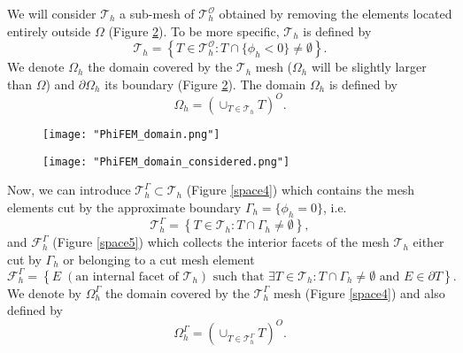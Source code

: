 We will consider $\mathcal{T}_h$ a sub-mesh of $\mathcal{T}_h^\mathcal{O}$ obtained by removing the elements located entirely outside $\Omega$ (Figure \ref{space3}). To be more specific, $\mathcal{T}_h$ is defined by
\begin{equation*}
	\mathcal{T}_h=\left\{T\in \mathcal{T}_h^\mathcal{O}:T\cap\{\phi_h<0\}\ne\emptyset\right\}.
\end{equation*}
We denote $\Omega_h$ the domain covered by the $\mathcal{T}_h$ mesh ($\Omega_h$ will be slightly larger than $\Omega$) and $\partial\Omega_h$ its boundary (Figure \ref{space3}). The domain $\Omega_h$ is defined by
\begin{equation*}
	\Omega_h=\left(\cup_{T\in\mathcal{T}_h}T\right)^O.
\end{equation*}

\begin{minipage}{0.52\linewidth}
	\begin{figure}[H]
		\centering
		\texttt{[image: "PhiFEM\_domain.png"]}
		\label{space2}
	\end{figure}
\end{minipage} \;
\begin{minipage}{0.44\linewidth}
	\begin{figure}[H]
		\centering
		\texttt{[image: "PhiFEM\_domain\_considered.png"]}
		\label{space3}
	\end{figure}
\end{minipage}

Now, we can introduce $\mathcal{T}_h^\Gamma\subset \mathcal{T}_h$ (Figure \ref{space4}) which contains the mesh elements cut by the
approximate boundary $\Gamma_h = \{\phi_h=0\}$, i.e. 
\begin{equation*}
	\mathcal{T}_h^\Gamma=\left\{T\in \mathcal{T}_h:T\cap\Gamma_h\ne\emptyset\right\},
\end{equation*}
and $\mathcal{F}_h^\Gamma$ (Figure \ref{space5}) which collects the interior facets of the mesh $\mathcal{T}_h$ either cut by $\Gamma_h$ or belonging to a cut mesh element
\begin{equation*}
	\mathcal{F}_h^\Gamma=\left\{E\;(\text{an internal facet of } \mathcal{T}_h) \text{ such that } \exists T\in \mathcal{T}_h:T\cap\Gamma_h\ne\emptyset \text{ and } E\in\partial T\right\}.
\end{equation*}
We denote by $\Omega_h^\Gamma$ the domain covered by the $\mathcal{T}_h^\Gamma$ mesh (Figure \ref{space4}) and also defined by
\begin{equation*}
	\Omega_h^\Gamma=\left(\cup_{T\in\mathcal{T}_h^\Gamma}T\right)^O.
\end{equation*}

